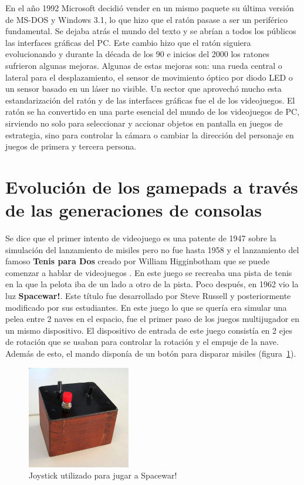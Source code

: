 En el a\~no 1992 Microsoft decidi\'o vender en un mismo paquete su \'ultima versi\'on de MS-DOS y Windows 3.1, lo que hizo que el rat\'on pasase a ser un perif\'erico fundamental. Se dejaba atr\'as el mundo del texto y se abr\'ian a todos los p\'ublicos las interfaces gr\'aficas del PC. Este cambio hizo que el rat\'on siguiera evolucionando y durante la d\'ecada de los 90 e inicios del 2000 los ratones sufrieron algunas mejoras. Algunas de estas mejoras son: una rueda central o lateral para el desplazamiento, el sensor de movimiento \'optico por diodo LED o un sensor basado en un l\'aser no visible. Un sector que aprovech\'o mucho esta estandarizaci\'on del rat\'on y de las interfaces gr\'aficas fue el de los videojuegos. El rat\'on se ha convertido en una parte esencial del mundo de los videojuegos de PC, sirviendo no solo para seleccionar y accionar objetos en pantalla en juegos de estrategia, sino para controlar la c\'amara o cambiar la direcci\'on del personaje en juegos de primera y tercera persona.\\


\section{Evoluci\'on de los gamepads a trav\'es de las generaciones de consolas}

Se dice que el primer intento de videojuego es una patente de 1947 sobre la simulaci\'on del lanzamiento de misiles pero no fue hasta 1958 y el lanzamiento del famoso \textbf{Tenis para Dos} creado por William Higginbotham que se puede comenzar a hablar de videojuegos \citep{tenispara2}. En este juego se recreaba una pista de tenis en la que la pelota iba de un lado a otro de la pista. Poco despu\'es, en 1962 vio la luz \textbf{Spacewar!}. Este t\'itulo fue desarrollado por Steve Russell y posteriormente modificado por sus estudiantes. En este juego lo que se quer\'ia era simular una pelea entre 2 naves en el espacio, fue el primer paso de los juegos multijugador en un mismo dispositivo. El dispositivo de entrada de este juego consist\'ia en 2 ejes de rotaci\'on que se usaban para controlar la rotaci\'on y el empuje de la nave. Adem\'as de esto, el mando dispon\'ia de un bot\'on para disparar misiles (figura~\ref{Fig:spacewar}).\\


\begin{figure}[t]
\centering
\includegraphics[width=0.4\textwidth]{./Imagenes/Bitmap/spacewar-controller.jpg}
\caption{Joystick utilizado para jugar a Spacewar!}
\label{Fig:spacewar}
\end{figure}

